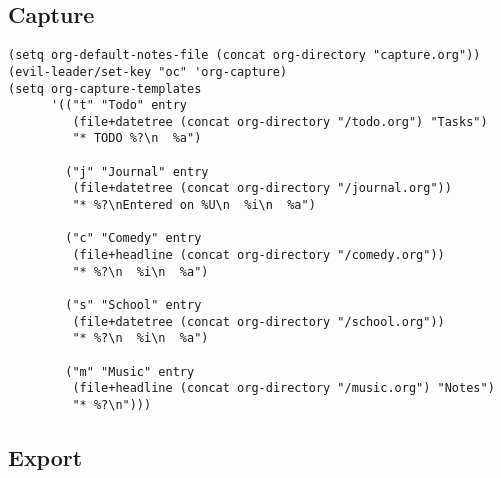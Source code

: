 \documentclass[11pt]{article}
\begin{document}
\subsection{Capture}
\label{sec-10-2}


\begin{verbatim}
(setq org-default-notes-file (concat org-directory "capture.org")) 
(evil-leader/set-key "oc" 'org-capture) 
(setq org-capture-templates
      '(("t" "Todo" entry
         (file+datetree (concat org-directory "/todo.org") "Tasks")
         "* TODO %?\n  %a")

        ("j" "Journal" entry
         (file+datetree (concat org-directory "/journal.org"))
         "* %?\nEntered on %U\n  %i\n  %a")

        ("c" "Comedy" entry
         (file+headline (concat org-directory "/comedy.org"))
         "* %?\n  %i\n  %a")

        ("s" "School" entry
         (file+datetree (concat org-directory "/school.org"))
         "* %?\n  %i\n  %a")

        ("m" "Music" entry
         (file+headline (concat org-directory "/music.org") "Notes")
         "* %?\n")))
\end{verbatim}
\subsection{Export}
\label{sec-10-3}
\end{document}
